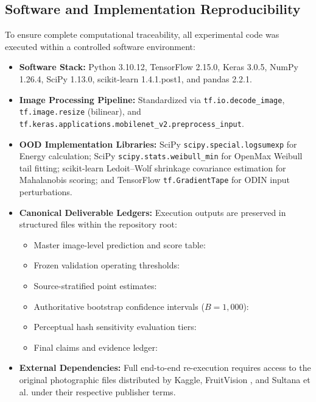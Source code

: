 \subsection{Software and Implementation Reproducibility}
\label{sec:software_environment}

To ensure complete computational traceability, all experimental code was executed within a controlled software environment:
\begin{itemize}
\item \textbf{Software Stack:} Python 3.10.12, TensorFlow 2.15.0, Keras 3.0.5, NumPy 1.26.4, SciPy 1.13.0, scikit-learn 1.4.1.post1, and pandas 2.2.1.
\item \textbf{Image Processing Pipeline:} Standardized via {\small\nolinkurl{tf.io.decode_image}}, {\small\nolinkurl{tf.image.resize}} (bilinear), and {\small\nolinkurl{tf.keras.applications.mobilenet_v2.preprocess_input}}.
\item \textbf{OOD Implementation Libraries:} SciPy {\small\nolinkurl{scipy.special.logsumexp}} for Energy calculation; SciPy {\small\nolinkurl{scipy.stats.weibull_min}} for OpenMax Weibull tail fitting; scikit-learn Ledoit--Wolf shrinkage covariance estimation for Mahalanobis scoring; and TensorFlow {\small\nolinkurl{tf.GradientTape}} for ODIN input perturbations.
\item \textbf{Canonical Deliverable Ledgers:} Execution outputs are preserved in structured files within the repository root:
\begin{itemize}
\item Master image-level prediction and score table: 
\item Frozen validation operating thresholds: 
\item Source-stratified point estimates: 
\item Authoritative bootstrap confidence intervals ($B = 1,000$): 
\item Perceptual hash sensitivity evaluation tiers: 
\item Final claims and evidence ledger: 
\end{itemize}
\item \textbf{External Dependencies:} Full end-to-end re-execution requires access to the original photographic files distributed by Kaggle, FruitVision \cite{bijoy2025fruitvision}, and Sultana et al. \cite{sultana2022extensive} under their respective publisher terms.
\end{itemize}
